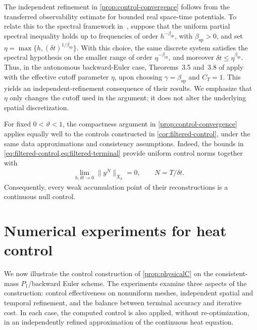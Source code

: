 \documentclass[print,wide,eng]{draft}
\begin{document}
%
\begin{remark}\label{rem:spectral-comparison}
The independent refinement in \cref{prop:control-convergence} follows from the transferred observability estimate for bounded real space-time potentials. To relate this to the spectral framework in~\cite{BHLR11}, suppose that the uniform partial spectral inequality holds up to frequencies of order $h^{-\beta_{\mathrm{sp}}}$, with $\beta_{\mathrm{sp}}>0$, and set
$
\eta=\max\{h,(\delta t)^{1/\beta_{\mathrm{sp}}}\}$.
With this choice, the same discrete system satisfies the spectral hypothesis on the smaller range of order $\eta^{-\beta_{\mathrm{sp}}}$, and moreover $\delta t\le\eta^{\beta_{\mathrm{sp}}}$. Thus, in the autonomous backward-Euler case, Theorems~3.5 and~3.8 of \cite{BHLR11} apply with the effective cutoff parameter $\eta$, upon choosing $\gamma=\beta_{\mathrm{sp}}$ and $C_T=1$. This yields an independent-refinement consequence of their results. We emphasize that $\eta$ only changes the cutoff used in the argument; it does not alter the underlying spatial discretization.
\end{remark}
%
\begin{remark}\label{rem:filtered-control-limit}
For fixed $0<\vartheta<1$, the compactness argument in \cref{prop:control-convergence} applies equally well to the controls constructed in \cref{cor:filtered-control}, under the same data approximations and consistency assumptions. Indeed, the bounds in \cref{eq:filtered-control,eq:filtered-terminal} provide uniform control norms together with
\begin{align*}
\lim_{h,\delta t\to0}\|y^N\|_{X_h}=0,
\qquad N=T/\delta t.
\end{align*}
Consequently, every weak accumulation point of their reconstructions is a continuous null control.
\end{remark}
%

\vspace{-2mm}

\section{Numerical experiments for heat control}\label{sec:numerics}

We now illustrate the  control construction of \cref{prop:physicalC} on the consistent-mass $P_1$/backward Euler scheme. The experiments examine three aspects of the construction: control effectiveness on nonuniform meshes, independent spatial and temporal refinement, and the balance between terminal accuracy and iterative cost. In each case, the computed control is also applied, without re-optimization, in an independently refined approximation of the continuous heat equation.
\end{document}
